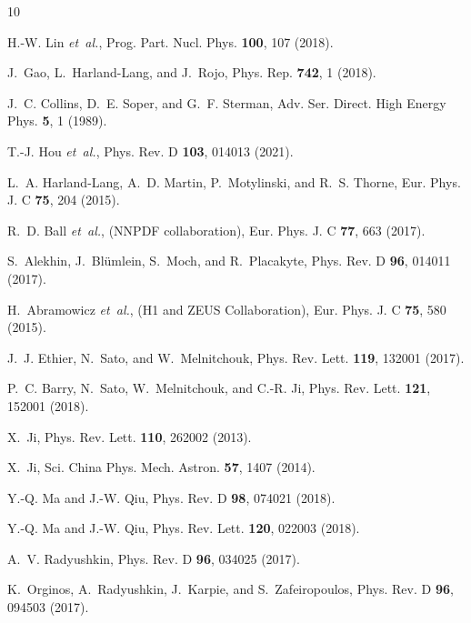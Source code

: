 \documentclass[aps,prl,twocolumn,superscriptaddress,notitlepage,nofootinbib]{revtex4-1}
\begin{document}

%   
%

\begin{thebibliography}{10}

H.-W. Lin {\em et~al.},
\newblock Prog. Part. Nucl. Phys. {\bf 100}, 107 (2018).

J.~Gao, L.~Harland-Lang, and J.~Rojo,
\newblock Phys. Rep. {\bf 742}, 1 (2018).

J.~C. Collins, D.~E. Soper, and G.~F. Sterman,
\newblock Adv. Ser. Direct. High Energy Phys. {\bf 5}, 1 (1989).

T.-J. Hou {\em et~al.},
\newblock Phys. Rev. D {\bf 103}, 014013 (2021).

L.~A. Harland-Lang, A.~D. Martin, P.~Motylinski, and R.~S. Thorne,
\newblock Eur. Phys. J. C {\bf 75}, 204 (2015).

R.~D. Ball {\em et~al.}, (NNPDF collaboration),
\newblock Eur. Phys. J. C {\bf 77}, 663 (2017).

S.~Alekhin, J.~Bl\"umlein, S.~Moch, and R.~Placakyte,
\newblock Phys. Rev. D {\bf 96}, 014011 (2017).

H.~Abramowicz {\em et~al.}, (H1 and ZEUS Collaboration),
\newblock Eur. Phys. J. C {\bf 75}, 580 (2015).

J.~J. Ethier, N.~Sato, and W.~Melnitchouk,
\newblock Phys. Rev. Lett. {\bf 119}, 132001 (2017).

P.~C. Barry, N.~Sato, W.~Melnitchouk, and C.-R. Ji,
\newblock Phys. Rev. Lett. {\bf 121}, 152001 (2018).

X.~Ji,
\newblock Phys. Rev. Lett. {\bf 110}, 262002 (2013).

X.~Ji,
\newblock Sci. China Phys. Mech. Astron. {\bf 57}, 1407 (2014).

Y.-Q. Ma and J.-W. Qiu,
\newblock Phys. Rev. D {\bf 98}, 074021 (2018).

Y.-Q. Ma and J.-W. Qiu,
\newblock Phys. Rev. Lett. {\bf 120}, 022003 (2018).

A.~V. Radyushkin,
\newblock Phys. Rev. D {\bf 96}, 034025 (2017).

K.~Orginos, A.~Radyushkin, J.~Karpie, and S.~Zafeiropoulos,
\newblock Phys. Rev. D {\bf 96}, 094503 (2017).


\end{thebibliography}
\end{document}
